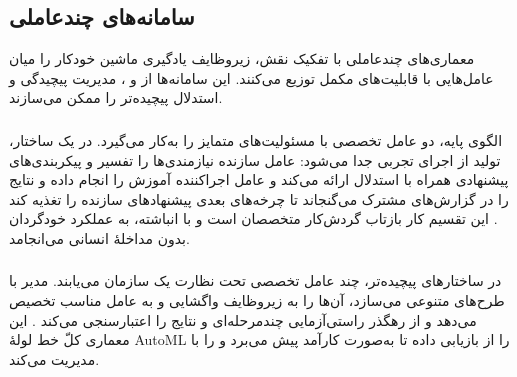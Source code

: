 \subsection{سامانه‌های چندعاملی}

معماری‌های چندعاملی با تفکیک نقش، زیروظایف یادگیری ماشین خودکار را میان عامل‌هایی با قابلیت‌های مکمل توزیع می‌کنند. این سامانه‌ها از  و ، مدیریت پیچیدگی و استدلال پیچیده‌تر را ممکن می‌سازند.

\subsubsection{\protect{}}
الگوی پایه، دو عامل تخصصی با مسئولیت‌های متمایز را به‌کار می‌گیرد. در یک ساختار، تولید  از اجرای تجربی جدا می‌شود: عامل سازنده نیازمندی‌ها را تفسیر و پیکربندی‌های پیشنهادی همراه با استدلال ارائه می‌کند و عامل اجراکننده آموزش را انجام داده و نتایج را در گزارش‌های مشترک می‌گنجاند تا چرخه‌های بعدی پیشنهادهای سازنده را تغذیه کند \cite{liu2025agenthpo}. این تقسیم کار بازتاب گردش‌کار متخصصان است و با  انباشته، به عملکرد خودگردان بدون مداخلهٔ انسانی می‌انجامد.

\subsubsection{\protect{}}
در ساختارهای پیچیده‌تر، چند عامل تخصصی تحت نظارت یک  سازمان می‌یابند. مدیر با  طرح‌های متنوعی می‌سازد، آن‌ها را به زیروظایف  واگشایی و به عامل مناسب تخصیص می‌دهد و از رهگذر راستی‌آزمایی چندمرحله‌ای و  نتایج را اعتبارسنجی می‌کند \cite{trirat2025automlagent}. این معماری کلّ خط لولهٔ AutoML را از بازیابی داده تا  به‌صورت کارآمد پیش می‌برد و  را با  مدیریت می‌کند.

